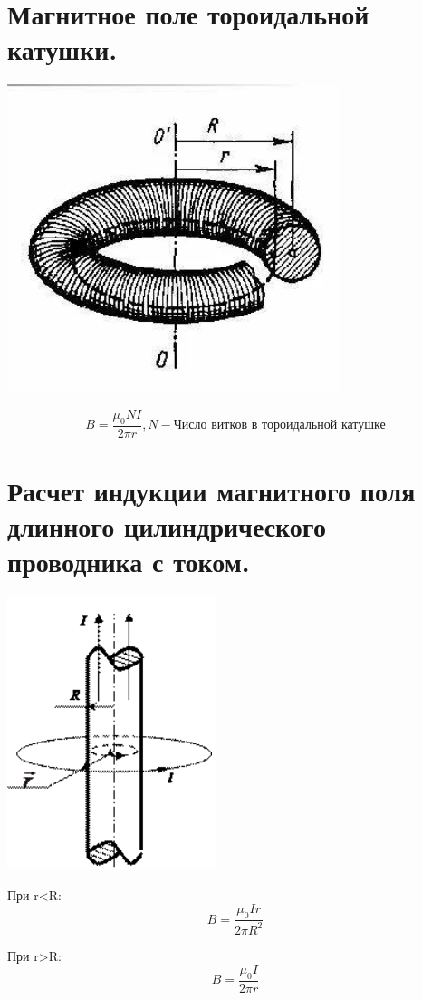 \documentclass[12pt]{report}
\begin{document}
\section{Магнитное поле тороидальной катушки.}
\begin{center}
    \includegraphics[scale=0.7]{graphics/t25.png}
\end{center}
\[B=\frac{\mu_0 N I}{2\pi r}, N-\text{Число витков в тороидальной катушке}\]
\section{Расчет индукции магнитного поля длинного цилиндрического проводника с током.}
\begin{center}
    \includegraphics[scale=0.9]{graphics/t26.png}
\end{center}
При r<R:
\[B=\frac{\mu_0 I r}{2\pi R^2}\]

При r>R:
\[B=\frac{\mu_0 I }{2\pi r}\]
\end{document}
